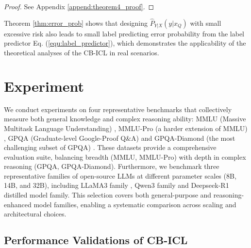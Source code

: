 \documentclass{article} %
\theoremstyle{plain} %
\begin{document}
\begin{proof}
    See Appendix \ref{append:theorem4_proof}.
\end{proof}

Theorem \ref{thm:error_prob} shows that designing $\hat{P}_{Y|X}(y|x_Q)$ with small excessive risk also leads to small label predicting error probability from the label predictor Eq. (\ref{equ:label_predictor}), which demonstrates the applicability of the theoretical analyses of the CB-ICL in real scenarios.


\section{Experiment}\label{sec:exp}

We conduct experiments on four representative benchmarks that collectively measure both general knowledge and complex reasoning ability: MMLU (Massive Multitask Language Understanding) \citep{hendrycks2020measuring}, MMLU-Pro (a harder extension of MMLU) \citep{wang2024mmlu}, GPQA (Graduate-level Google-Proof Q\&A) and GPQA-Diamond (the most challenging subset of GPQA) \citep{rein2024gpqa}. These datasets provide a comprehensive evaluation suite, balancing breadth (MMLU, MMLU-Pro) with depth in complex reasoning (GPQA, GPQA-Diamond). Furthermore, we benchmark three representative families of open-source LLMs at different parameter scales (8B, 14B, and 32B), including LLaMA3 family \citep{dubey2024llama}, Qwen3 family \citep{yang2025qwen3} and Deepseek-R1 \citep{guo2025deepseek} distilled model family. This selection covers both general-purpose and reasoning-enhanced model families, enabling a systematic comparison across scaling and architectural choices.

\subsection{Performance Validations of CB-ICL}
\end{document}
